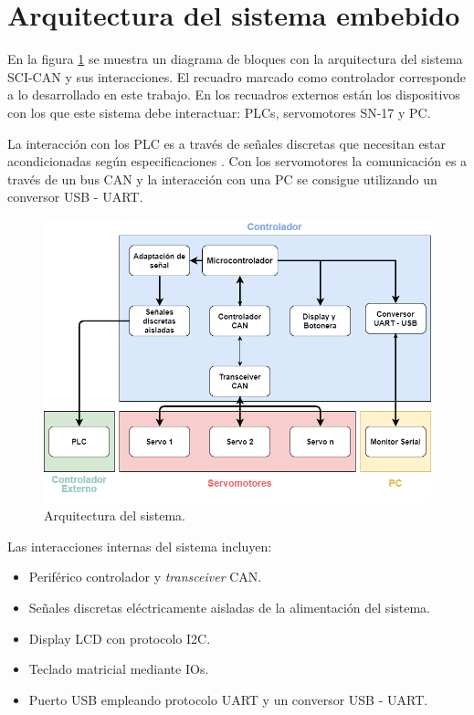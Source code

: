 \section{Arquitectura del sistema embebido}

En la figura \ref{fig:arquitectura_sistema} se muestra un diagrama de bloques con la arquitectura del sistema SCI-CAN y sus interacciones. El recuadro marcado como controlador corresponde a lo desarrollado en este trabajo. En los recuadros externos están los dispositivos con los que este sistema debe interactuar: PLCs, servomotores SN-17 y PC.

La interacción con los PLC es a través de señales discretas que necesitan estar acondicionadas según especificaciones \citep{plan_trabajo}. Con los servomotores la comunicación es a través de un bus CAN y la interacción con una PC se consigue utilizando un conversor USB - UART.

\begin{figure}[htbp]
	\centering
	\includegraphics[scale=.5]{./Figures/Arquitectura_SE.png}
	\caption{Arquitectura del sistema.}
	\label{fig:arquitectura_sistema}
\end{figure}

Las interacciones internas del sistema incluyen:
\begin{itemize}
	\item Periférico controlador y \textit{transceiver} CAN.
	\item Señales discretas eléctricamente aisladas de la alimentación del sistema.
	\item Display LCD con protocolo I2C.
	\item Teclado matricial mediante IOs.
	\item Puerto USB empleando protocolo UART y un conversor USB - UART.
\end{itemize}

